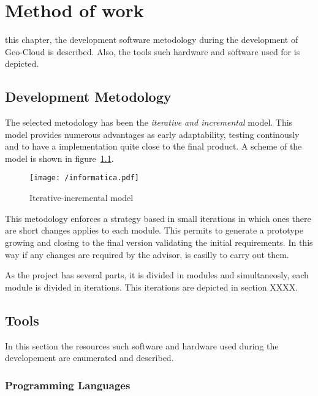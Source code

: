 \chapter{Method of work}
\label{chap:method}
 this chapter, the development software metodology during the
development of Geo-Cloud is described. Also, the tools such hardware and software used for is depicted.
 
\section{Development Metodology}

The selected metodology has been the \emph{iterative and incremental}
model. This model provides numerous advantages as early adaptability, testing
continously and to have a implementation quite close to the final product. A
scheme of the model is shown in figure~\ref{fig:IncrementalModel}.


\begin{figure}[!h]
\begin{center}
\texttt{[image: /informatica.pdf]}
\caption{Iterative-incremental model}
\label{fig:IncrementalModel}
\end{center}
\end{figure}

This metodology enforces a strategy based in small iterations in which ones
there are short changes applies to each module. This permits to generate a prototype
growing and closing to the final version validating the initial requirements. In
this way if any changes are required by the advisor, is easilly to carry out
them.
 
As the project has several parts, it is divided in modules and simultaneosly,
each module is divided in iterations. This iterations are depicted in section XXXX.

\section{Tools}

In this section the resources such software and hardware used during the
developement are enumerated and described.  



\subsection{Programming Languages}

